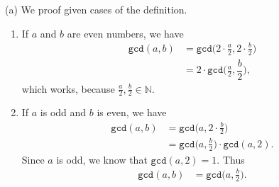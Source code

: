 \documentclass[12pt]{article}
\begin{document}
 


  (a) We proof given cases of the definition. \begin{enumerate}
 	\item If $a$ and $b$ are even numbers, we have \begin{align}
 		\texttt{gcd}(a,b) &= \texttt{gcd}\bigg(2\cdot\frac{a}{2},2\cdot\frac{b}{2}\bigg) \\
 		&=2\cdot\texttt{gcd}\bigg(\frac{a}{2},\dfrac{b}{2}\bigg),
 	\end{align} which works, because $\frac{a}{2},\frac{b}{2}\in\mathbb{N}$.
 	\item If $a$ is odd and $b$ is even, we have \begin{align}
 		\texttt{gcd}(a,b)&=\texttt{gcd}\bigg(a,2\cdot\frac{b}{2}\bigg) \\
 		&=\texttt{gcd}\bigg(a,\frac{b}{2}\bigg)\cdot\texttt{gcd}(a,2).
 	\end{align} Since $a$ is odd, we know that $\texttt{gcd}(a,2)=1$. Thus \begin{align*}
 		\texttt{gcd}(a,b)&=\texttt{gcd}\bigg(a,\frac{b}{2}\bigg).
 	\end{align*}
 \end{enumerate}
\end{document}
